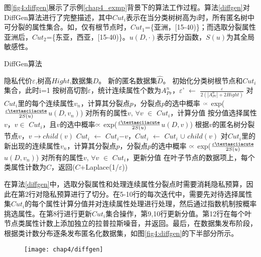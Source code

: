 图\ref{fig4:diffgen}展示了示例\ref{chap4_exmp}背景下的算法工作过程。算法\ref{diffgen}对DiffGen算法进行了完整描述，其中$Cut_{i}$表示在当分类树树高为i时，所有匿名树中可分裂的属性集合。如，仅有根节点时，$Cut_{1}$=\{亚洲，[15-40)\}；而选取分裂属性亚洲后，$Cut_{2}$=\{东亚，西亚，[15-40)\}。$u(D,\cdotp)$表示打分函数，$S(u)$为其全局敏感性。


\begin{algorithm}
	\caption{DiffGen算法} 
	\label{diffgen}
	\begin{algorithmic}[1]
		\REQUIRE 隐私代价$\varepsilon$,树高$Hight$,数据集$D$。
		\ENSURE 新的匿名数据集$\hat{D}$。
		\STATE 初始化分类树根节点和$Cut_{i}$集合，此时i=1
		\STATE 按树高切割$\varepsilon$，统计连续属性个数为$A_{Pr}^{n}$，$\varepsilon$' $\leftarrow$ $\frac{\varepsilon}{2(|A_{Pr}^{n}|+2Hight)}$
		\STATE 对$Cut_{i}$里的每个连续属性$v_{n}$，计算其分裂点$p$，分裂点$p$的选中概率 $\wasypropto$ exp($\frac{\varepsilon\textasciiacute}{2S(u)}$$u(D,v_{n})$)
		\STATE 对所有的属性$v$, $\forall$$v$ $\in$ $Cut_{i}$，计算分值
		\STATE 按分值选择属性$v$，$v$$\in$ $Cut_{i}$，且$v$的选中概率$\wasypropto$ exp($\frac{\varepsilon\textasciiacute}{2S(u)}$$u(D,v)$)
		\STATE 根据$v$的匿名树分裂节点$v$，$v$$\rightarrow$$child(v)$
		\STATE $Cut_{i}$ $\leftarrow$ $Cut_{i}$$ - $$v$，$Cut_{i}$ $\leftarrow$ $Cut_{i}$ $\cup$ $child(v)$
		\STATE 对$Cut_{i}$里的新出现的连续属性$v_{n}$，计算其分裂点$p$，分裂点$p$的选中概率 $\wasypropto$ exp($\frac{\varepsilon\textasciiacute}{2S(u)}$$u(D,v_{n})$)
		\STATE 对所有的属性$v$, $\forall$$v$ $\in$ $Cut_{i}$，更新分值
		\ENDFOR
		\RETURN 在叶子节点的数据项上，每个类属性计数为$C$，返回($C$+Laplace(1/$\varepsilon$))
	\end{algorithmic}
\end{algorithm}

在算法\ref{diffgen}中，选取分裂属性和处理连续属性分裂点时需要消耗隐私预算，因此在第2行对隐私预算进行了切分。在5-10行的每次迭代中，需要先对待选择属性集$Cut_{i}$的每个属性计算分值并对连续属性处理进行处理，然后通过指数机制按概率挑选属性。在第8行进行更新$Cut_{i}$集合操作，第9,10行更新分值。第12行在每个叶节点类属性计数上添加独立的拉普拉斯噪音，并返回。最后，在数据集发布阶段，根据类计数分布逐条发布匿名化数据集，如图\ref{fig4:diffgen}的下半部分所示。

\begin{figure}[!htp]
	\centering
	\texttt{[image: chap4/diffgen]}
\end{figure}


